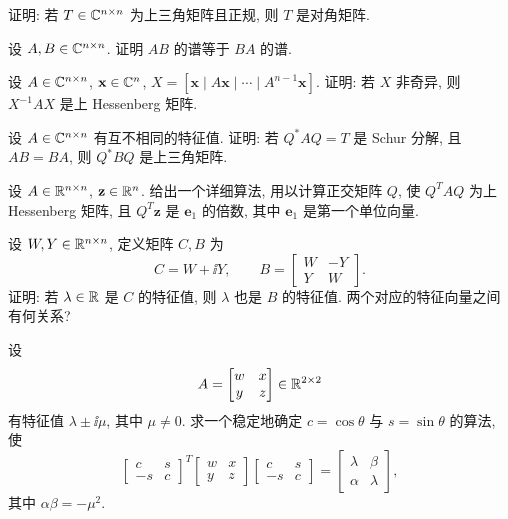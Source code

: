 \begin{exercises}
  \item 证明: 若 $T\in\mathbb{C}^{n\times n}$ 为上三角矩阵且正规, 则 $T$ 是对角矩阵.

  \item 设 $A,B\in\mathbb{C}^{n\times n}$. 证明 $AB$ 的谱等于 $BA$ 的谱.

  \item 设 $A\in\mathbb{C}^{n\times n}$, $\mathbf{x}\in\mathbb{C}^n$, $X=[\mathbf{x}\mid A\mathbf{x}\mid\cdots\mid A^{n-1}\mathbf{x}]$. 证明: 若 $X$ 非奇异, 则 $X^{-1}AX$ 是上 Hessenberg 矩阵.

  \item 设 $A\in\mathbb{C}^{n\times n}$ 有互不相同的特征值. 证明: 若 $Q^*AQ=T$ 是 Schur 分解, 且 $AB=BA$, 则 $Q^*BQ$ 是上三角矩阵.

  \item 设 $A\in\mathbb{R}^{n\times n}$, $\mathbf{z}\in\mathbb{R}^n$. 给出一个详细算法, 用以计算正交矩阵 $Q$, 使 $Q^TAQ$ 为上 Hessenberg 矩阵, 且 $Q^T\mathbf{z}$ 是 $\mathbf{e}_1$ 的倍数, 其中 $\mathbf{e}_1$ 是第一个单位向量.

  \item 设 $W,Y\in\mathbb{R}^{n\times n}$, 定义矩阵 $C,B$ 为
    \[
      C=W+\ii Y,\qquad
      B=\begin{bmatrix}
        W & -Y\\
        Y & W
      \end{bmatrix}.
    \]
    证明: 若 $\lambda\in\mathbb{R}$ 是 $C$ 的特征值, 则 $\lambda$ 也是 $B$ 的特征值. 两个对应的特征向量之间有何关系?

  \item 设
    \[
      A=\begin{bmatrix}
        w & x\\
        y & z
      \end{bmatrix}\in\mathbb{R}^{2\times2}
    \]
    有特征值 $\lambda\pm\ii\mu$, 其中 $\mu\neq0$. 求一个稳定地确定 $c=\cos\theta$ 与 $s=\sin\theta$ 的算法, 使
    \[
      \begin{bmatrix}
        c & s\\
        -s & c
      \end{bmatrix}^T
      \begin{bmatrix}
        w & x\\
        y & z
      \end{bmatrix}
      \begin{bmatrix}
        c & s\\
        -s & c
      \end{bmatrix}
      =\begin{bmatrix}
        \lambda & \beta\\
        \alpha & \lambda
      \end{bmatrix},
    \]
    其中 $\alpha\beta=-\mu^2$.


\end{exercises}
